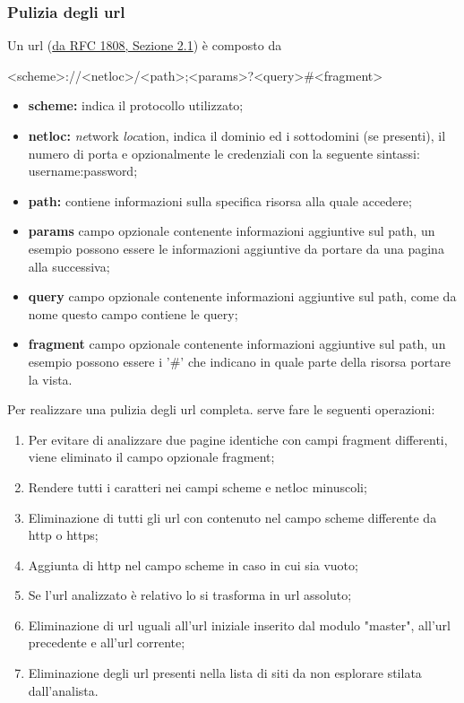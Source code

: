 \subsubsection{Pulizia degli url}
Un url (\href{https://datatracker.ietf.org/doc/html/rfc1808.html#section-2.1}{da RFC 1808, Sezione 2.1}) è composto da \newline
\centerline{<scheme>://<netloc>/<path>;<params>?<query>\#<fragment>}
\newline
\begin{itemize}
	\item \textbf{scheme:} indica il protocollo utilizzato;
	\item \textbf{netloc:} \textit{ne}twork \textit{loc}ation, indica il dominio ed i sottodomini (se presenti), il numero di porta e opzionalmente le credenziali con la seguente sintassi: username:password;
	\item \textbf{path:} contiene informazioni sulla specifica risorsa alla quale accedere;
	\item \textbf{params} campo opzionale contenente informazioni aggiuntive sul path, un esempio possono essere le informazioni aggiuntive da portare da una pagina alla successiva;
	\item \textbf{query} campo opzionale contenente informazioni aggiuntive sul path, come da nome questo campo contiene le query;
	\item \textbf{fragment} campo opzionale contenente informazioni aggiuntive sul path, un esempio possono essere i '\#' che indicano in quale parte della risorsa portare la vista.
\end{itemize}
\noindent
Per realizzare una pulizia degli url completa. serve fare le seguenti operazioni:
\begin{enumerate}
	\item Per evitare di analizzare due pagine identiche con campi fragment differenti, viene eliminato il campo opzionale fragment;
	\item Rendere tutti i caratteri nei campi scheme e netloc minuscoli;
	\item Eliminazione di tutti gli url con contenuto nel campo scheme differente da http o https;
	\item Aggiunta di http nel campo scheme in caso in cui sia vuoto;
	\item Se l'url analizzato è relativo lo si trasforma in url assoluto;
	\item Eliminazione di url uguali all'url iniziale inserito dal modulo "master", all'url precedente e all'url corrente;
	\item Eliminazione degli url presenti nella lista di siti da non esplorare stilata dall'analista.
\end{enumerate}

